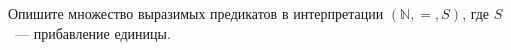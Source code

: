 Опишите множество выразимых предикатов в интерпретации $(\mathbb{N}, =, S)$, где $S$~--- прибавление
единицы.